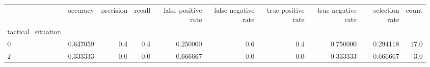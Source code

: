 \begin{tabular}{lrrrrrrrrr}
\toprule
{} &  accuracy &  precision &  recall &  false positive rate &  false negative rate &  true positive rate &  true negative rate &  selection rate &  count \\
tactical\_situation &           &            &         &                      &                      &                     &                     &                 &        \\
\midrule
0                  &  0.647059 &        0.4 &     0.4 &             0.250000 &                  0.6 &                 0.4 &            0.750000 &        0.294118 &   17.0 \\
2                  &  0.333333 &        0.0 &     0.0 &             0.666667 &                  0.0 &                 0.0 &            0.333333 &        0.666667 &    3.0 \\
\bottomrule
\end{tabular}
